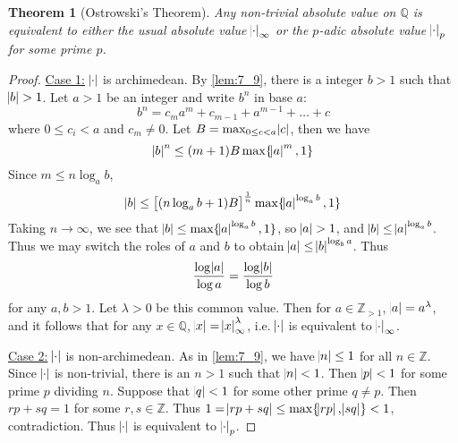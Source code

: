 \documentclass[11pt]{article}
\theoremstyle{definition}
\theoremstyle{plain}
\newtheorem{theorem}[definition]{Theorem}
\theoremstyle{remark}
\newcommand{\ZZ}{\mathbb{Z}}
\newcommand{\QQ}{\mathbb{Q}}
\begin{document}
\begin{theorem}[Ostrowski's Theorem]\label{thm:7_10}
    Any non-trivial absolute value on $\QQ$ is equivalent to either the usual absolute value $\abs{\cdot}_\infty$ or the $p$-adic absolute value $\abs{\cdot}_p$ for some prime $p$.
\end{theorem}
\begin{proof}
    \underline{Case 1:} $\abs{\cdot}$ is archimedean.
    By \autoref{lem:7_9}, there is a integer $b > 1$ such that $\abs{b} > 1$. Let $a > 1$ be an integer and write $b^n$ in base $a$:
    \begin{equation*}
        b^n = c_m a^m + c_{m-1} + a^{m-1} + \ldots + c
    \end{equation*}
    where $0 \le c_i < a$ and $c_m \neq 0$. Let $B = \max_{0 \le c < a} \abs{c}$, then we have
    \begin{equation*}
        \abs{b}^n \le (m + 1) B \max \{\abs{a}^m, 1\}
    \end{equation*}
    Since $m \le n \log_a{b}$,
    \begin{equation*}
        \abs{b} \le \left[(n \log_a{b} + 1) B \right]^{\frac{1}{n}} \max \{\abs{a}^{\log_a{b}}, 1\}
    \end{equation*}
    Taking $n \to \infty$, we see that $\abs{b} \le \max \{\abs{a}^{\log_a{b}}, 1\}$, so $\abs{a} > 1$, and $\abs{b} \le \abs{a}^{\log_a{b}}$. Thus we may switch the roles of $a$ and $b$ to obtain $\abs{a} \le \abs{b}^{\log_b{a}}$. Thus
    \begin{equation*}
        \frac{\log{\abs{a}}}{\log{a}} = \frac{\log{\abs{b}}}{\log{b}}
    \end{equation*}
    for any $a, b > 1$. Let $\lambda > 0$ be this common value. Then for $a \in \ZZ_{>1}$, $\abs{a} = a^\lambda$, and it follows that for any $x \in \QQ$, $\abs{x} = \abs{x}_\infty^\lambda$, i.e. $\abs{\cdot}$ is equivalent to $\abs{\cdot}_\infty$.

    \underline{Case 2:} $\abs{\cdot}$ is non-archimedean. As in \autoref{lem:7_9}, we have $\abs{n} \le 1$ for all $n \in \ZZ$. Since $\abs{\cdot}$ is non-trivial, there is an $n > 1$ such that $\abs{n} < 1$. Then $\abs{p} < 1$ for some prime $p$ dividing $n$. Suppose that $\abs{q} < 1$ for some other prime $q \neq p$. Then $rp + sq = 1$ for some $r, s \in \ZZ$. Thus $1 = \abs{rp + sq} \le \max\{\abs{rp}, \abs{sq}\} < 1$, contradiction. Thus $\abs{\cdot}$ is equivalent to $\abs{\cdot}_p$.
\end{proof}
\end{document}
